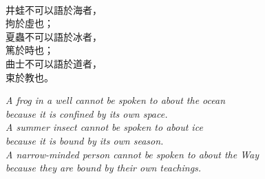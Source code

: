 \thispagestyle{empty}
\pagecolor{bg}
\text{}
\vfill
\noindent
\begin{minipage}[t]{0.35\textwidth}
	\begin{flushright}
		\textcolor{goban}{\large
			\\
			井蛙不可以語於海者，\\
			拘於虛也；\\[0.5em]
			夏蟲不可以語於冰者，\\
			篤於時也；\\[0.5em]
			曲士不可以語於道者，\\
			束於教也。
		}
	\end{flushright}
\end{minipage}%
\hfill
{\color{goban}\vrule}
\hfill
\begin{minipage}[t]{0.48\textwidth}
	\vspace{1pt}
	\raggedright
	\emph{
		$\!\!$\textcolor{goban}{A frog in a well cannot be spoken to about the ocean\\
			because it is confined by its own space.\\[0.5em]
			A summer insect cannot be spoken to about ice \\
			because it is bound by its own season.\\[0.5em]
			A narrow-minded person cannot be spoken to about the Way \\
			because they are bound by their own teachings.}
	}
\end{minipage}

